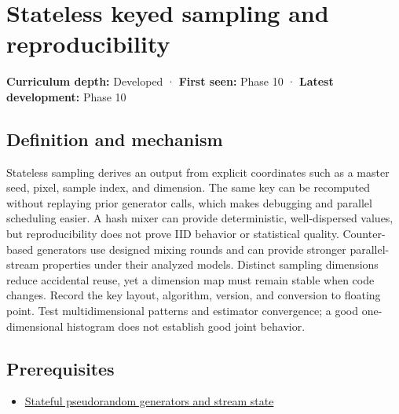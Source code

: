 \hypertarget{appendix-daaf25bfd3a0}{}\label{referencestart:appendix-daaf25bfd3a0}
\section{Stateless keyed sampling and reproducibility}\label{appendix-daaf25bfd3a0-stateless-keyed-sampling-and-reproducibility}

\hypertarget{appendix-daaf25bfd3a0-stateless-keyed-sampling-and-reproducibility}{}

\textbf{Curriculum depth:} Developed · \textbf{First seen:} Phase 10 · \textbf{Latest development:} Phase 10

\begin{allmightroledefinition}

\subsection{Definition and mechanism}\label{appendix-daaf25bfd3a0-definition-and-mechanism}

\hypertarget{appendix-daaf25bfd3a0-definition-and-mechanism}{}

Stateless sampling derives an output from explicit coordinates such as a master seed, pixel, sample index, and dimension. The same key can be recomputed without replaying prior generator calls, which makes debugging and parallel scheduling easier. A hash mixer can provide deterministic, well-dispersed values, but reproducibility does not prove IID behavior or statistical quality. Counter-based generators use designed mixing rounds and can provide stronger parallel-stream properties under their analyzed models. Distinct sampling dimensions reduce accidental reuse, yet a dimension map must remain stable when code changes. Record the key layout, algorithm, version, and conversion to floating point. Test multidimensional patterns and estimator convergence; a good one-dimensional histogram does not establish good joint behavior.

\end{allmightroledefinition}

\subsection{Prerequisites}\label{appendix-daaf25bfd3a0-prerequisites}

\hypertarget{appendix-daaf25bfd3a0-prerequisites}{}

\begin{itemize}
\tightlist
\item
  \hyperref[appendix-e0f7c7e08f3a]{Stateful pseudorandom generators and stream state}
\end{itemize}

